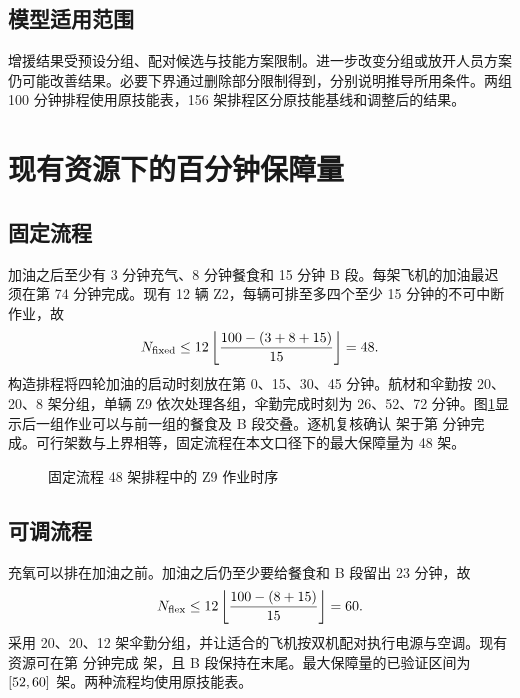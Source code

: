 \documentclass[UTF8,12pt,a4paper,fontset=none]{ctexart}
\newcommand{\sectionpage}{\clearpage}
\begin{document}
\subsection{模型适用范围}
增援结果受预设分组、配对候选与技能方案限制。进一步改变分组或放开人员方案仍可能改善结果。必要下界通过删除部分限制得到，分别说明推导所用条件。两组 100 分钟排程使用原技能表，156 架排程区分原技能基线和调整后的结果。

\sectionpage
\section{现有资源下的百分钟保障量}
\subsection{固定流程}
加油之后至少有 3 分钟充气、8 分钟餐食和 15 分钟 B 段。每架飞机的加油最迟须在第 74 分钟完成。现有 12 辆 Z2，每辆可排至多四个至少 15 分钟的不可中断作业，故
\begin{equation}
N_{\rm fixed}\le 12\left\lfloor\frac{100-(3+8+15)}{15}\right\rfloor=48.
\end{equation}
构造排程将四轮加油的启动时刻放在第 0、15、30、45 分钟。航材和伞勤按 20、20、8 架分组，单辆 Z9 依次处理各组，伞勤完成时刻为 26、52、72 分钟。图\ref{fig:q1-waves}显示后一组作业可以与前一组的餐食及 B 段交叠。逐机复核确认 \FixedShortAircraft 架于第 \FixedShortLast 分钟完成。可行架数与上界相等，固定流程在本文口径下的最大保障量为 48 架。
\begin{figure}[ht]
\centering
{}
\caption{固定流程 48 架排程中的 Z9 作业时序}
\label{fig:q1-waves}
\end{figure}
\subsection{可调流程}
充氧可以排在加油之前。加油之后仍至少要给餐食和 B 段留出 23 分钟，故
\begin{equation}
N_{\rm flex}\le 12\left\lfloor\frac{100-(8+15)}{15}\right\rfloor=60.
\end{equation}
采用 20、20、12 架伞勤分组，并让适合的飞机按双机配对执行电源与空调。现有资源可在第 \FlexShortLast 分钟完成 \FlexShortAircraft 架，且 B 段保持在末尾。最大保障量的已验证区间为 $[52,60]$ 架。两种流程均使用原技能表。
\end{document}
